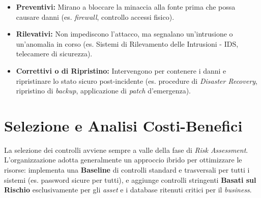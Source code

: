 \begin{center}
\end{center}

\begin{itemize}
    \item \textbf{Preventivi:} Mirano a bloccare la minaccia alla fonte prima che possa causare danni (es. \textit{firewall}, controllo accessi fisico).
    \item \textbf{Rilevativi:} Non impediscono l'attacco, ma segnalano un'intrusione o un'anomalia in corso (es. Sistemi di Rilevamento delle Intrusioni - IDS, telecamere di sicurezza).
    \item \textbf{Correttivi o di Ripristino:} Intervengono per contenere i danni e ripristinare lo stato sicuro post-incidente (es. procedure di \textit{Disaster Recovery}, ripristino di \textit{backup}, applicazione di \textit{patch} d'emergenza).
\end{itemize}

\section{Selezione e Analisi Costi-Benefici}
La selezione dei controlli avviene sempre a valle della fase di \textit{Risk Assessment}. L'organizzazione adotta generalmente un approccio ibrido per ottimizzare le risorse: implementa una \textbf{Baseline} di controlli standard e trasversali per tutti i sistemi (es. password sicure per tutti), e aggiunge controlli stringenti \textbf{Basati sul Rischio} esclusivamente per gli \textit{asset} e i database ritenuti critici per il \textit{business}.

